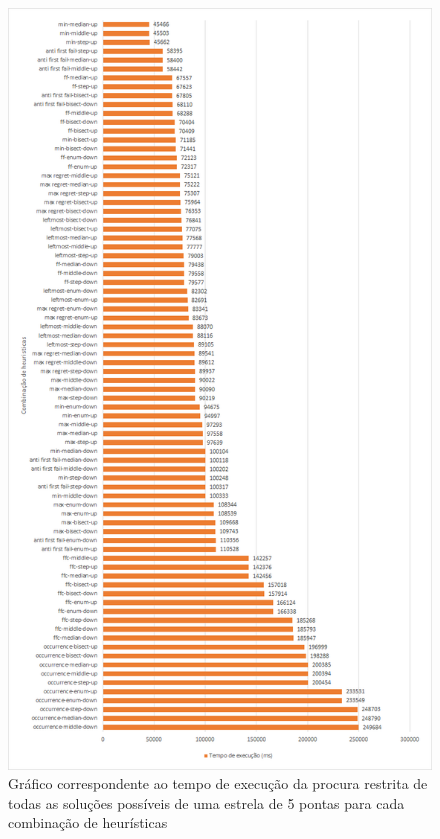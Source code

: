 \begin{figure}[!h]
\includegraphics[width=\textwidth]{images/heuristics.png}
\caption{Gráfico correspondente ao tempo de execução da procura restrita de todas as soluções possíveis de uma estrela de 5 pontas para cada combinação de heurísticas} \label{fig:tempo_execucao_combinacoes_heuristicas}
\end{figure}

